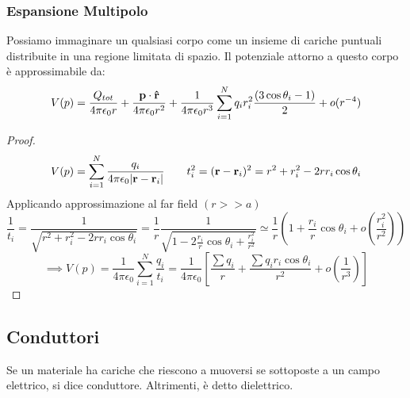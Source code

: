 \documentclass[12pt,a4paper]{article}
\begin{document}
\subsubsection{Espansione Multipolo}
Possiamo immaginare un qualsiasi corpo come un insieme di cariche puntuali distribuite in una regione limitata di spazio.
Il potenziale attorno a questo corpo è approssimabile da:
\begin{equation*}
    V(p)= \frac{Q_{tot}}{4\pi\epsilon_0 r}+ \frac{\vb{p}\cdot\vu{r}}{4\pi\epsilon_0r^2}+ \frac{1}{4\pi\epsilon_0r^3}
    \sum_{i=1}^{N} q_i r_i^2\frac{(3 \cos\theta_i-1)}{2} + o(r^{-4})
\end{equation*}
\begin{proof}
    \begin{equation*}
        V(p)= \sum_{i=1}^{N} \frac{q_i}{4\pi\epsilon_0\abs{\vb{r}-\vb{r}_i}} 
        \quad \quad t_i^2= (\vb{r}-\vb{r}_i)^2= r^2+r_i^2-2rr_i\cos \theta_i
    \end{equation*}
    Applicando approssimazione al far field $(r>>a)$
    \begin{equation*}
        \frac{1}{t_i}= \frac{1}{\sqrt{r^2+r_i^2-2rr_i\cos \theta_i}}= \frac{1}{r}\frac{1}{\sqrt{1-2\frac{r_i}{r}\cos \theta_i + \frac{r_i^2}{r^2}}}
        \simeq\frac{1}{r}\left( 1+ \frac{r_i}{r}\cos \theta_i +o(\frac{r_i^2}{r^2})\right)
    \end{equation*}
    \begin{equation*}
        \implies V(p)= \frac{1}{4\pi\epsilon_0}\sum_{i=1}^{N} \frac{q_i}{t_i}= \frac{1}{4\pi\epsilon_0} \left[ \frac{\sum q_i}{r}+\frac{\sum q_ir_i \cos \theta_i}{r^2} + o(\frac{1}{r^3})\right]
    \end{equation*}
\end{proof}

\subsection{Conduttori}
\begin{definition}
    Se un materiale ha cariche che riescono a muoversi se sottoposte a un campo elettrico, si dice conduttore. Altrimenti, è detto dielettrico.
\end{definition}
\end{document}
